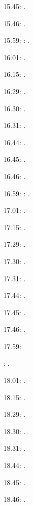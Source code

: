\documentclass[italian]{article}
\begin{document}
15.45:     .

15.46:     .

15.59:     
:    .

16.01:     . 

16.15:     . 

16.29:     . 

16.30:     .

16.31:     .

16.44:     .

16.45:     .

16.46:     .

16.59:     
:    .

17.01:     . 

17.15:     . 

17.29:     . 

17.30:     .

17.31:     .

17.44:     .

17.45:     .

17.46:     .

17.59:     

:    .

18.01:     . 

18.15:     . 

18.29:     . 

18.30:     .

18.31:     .

18.44:     .

18.45:     .

18.46:     .
\end{document}
